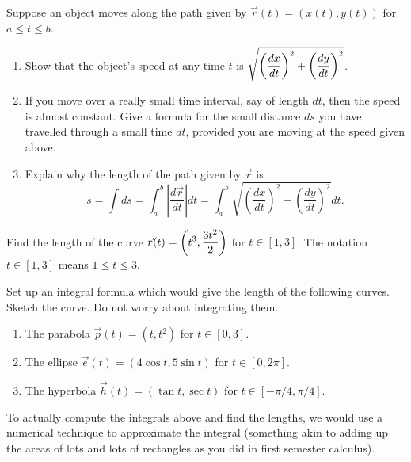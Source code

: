 \begin{problem} 
Suppose an object moves along the path given by $\vec r(t)=(x(t),y(t))$ for $a\leq t\leq b$. 
\begin{enumerate}
\item Show that the object's speed at any time $t$ is 
$\displaystyle\sqrt{\left(\frac{dx}{dt}\right)^2+\left(\frac{dy}{dt}\right)^2}$.
\item If you move over a really small time interval, say of length $dt$, then the speed is almost constant.  Give a formula for the small distance $ds$ you have travelled through a small time $dt$, provided you are moving at the speed given above. 
\item  Explain why the length of the path given by $\vec r$ is 
$$s=\int ds=\int_a^b \left|\frac{d\vec r}{dt}\right| dt=\int_a^b \sqrt{\left(\frac{dx}{dt}\right)^2+\left(\frac{dy}{dt}\right)^2}dt.$$
\end{enumerate}
\end{problem}

\begin{problem} 
Find the length of the curve  $\displaystyle \vec r(t) = \left(t^3,\frac{3t^2}{2}\right)$ for $t\in[1,3]$. The notation $t\in[1,3]$ means $1\leq t\leq 3$. 
\end{problem}

\begin{problem}
Set up an integral formula which would give the length of the following curves. Sketch the curve. Do not worry about integrating them.  
\begin{enumerate}
\item The parabola $\vec p(t) = (t,t^2)$ for $t\in[0,3]$.
\item The ellipse $\vec e(t) = (4\cos t,5\sin t)$ for $t\in[0,2\pi]$.
\item The hyperbola $\vec h(t) = (\tan t,\sec t)$ for $t\in[-\pi/ 4,\pi/4]$.
\end{enumerate}
\end{problem}
To actually compute the integrals above and find the lengths, we would use a numerical technique to approximate the integral (something akin to adding up the areas of lots and lots of rectangles as you did in first semester calculus).





